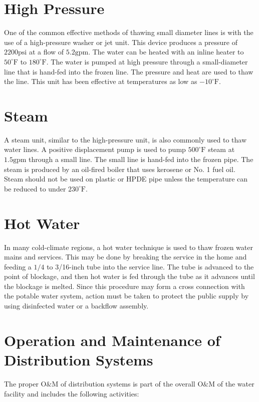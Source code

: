 \documentclass[10pt]{article}
\begin{document}
\section{High Pressure}
One of the common effective methods of thawing small diameter lines is with the use of a high-pressure washer or jet unit. This device produces a pressure of $2200 \mathrm{psi}$ at a flow of $5.2 \mathrm{gpm}$. The water can be heated with an inline heater to $50^{\circ} \mathrm{F}$ to $180^{\circ} \mathrm{F}$. The water is pumped at high pressure through a small-diameter line that is hand-fed into the frozen line. The pressure and heat are used to thaw the line. This unit has been effective at temperatures as low as $-10^{\circ} \mathrm{F}$.

\section{Steam}
A steam unit, similar to the high-pressure unit, is also commonly used to thaw water lines. A positive displacement pump is used to pump $500^{\circ} \mathrm{F}$ steam at $1.5 \mathrm{gpm}$ through a small line. The small line is hand-fed into the frozen pipe. The steam is produced by an oil-fired boiler that uses kerosene or No. 1 fuel oil. Steam should not be used on plastic or HPDE pipe unless the temperature can be reduced to under $230^{\circ} \mathrm{F}$.

\section{Hot Water}
In many cold-climate regions, a hot water technique is used to thaw frozen water mains and services. This may be done by breaking the service in the home and feeding a $1 / 4$ to 3/16-inch tube into the service line. The tube is advanced to the point of blockage, and then hot water is fed through the tube as it advances until the blockage is melted. Since this procedure may form a cross connection with the potable water system, action must be taken to protect the public supply by using disinfected water or a backflow assembly.

\section{Operation and Maintenance of Distribution Systems}
The proper $\mathrm{O} \& \mathrm{M}$ of distribution systems is part of the overall $\mathrm{O} \& \mathrm{M}$ of the water facility and includes the following activities:
\end{document}
